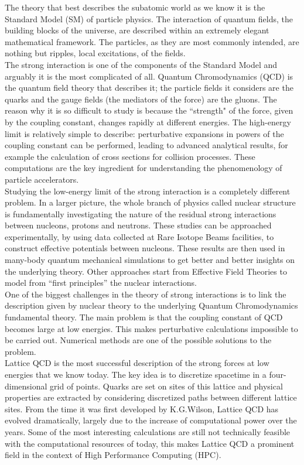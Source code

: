 The theory that best describes the subatomic world as we know it is the Standard Model (SM) of particle physics. The interaction of quantum fields, the building blocks of the universe, are described within an extremely elegant mathematical framework. The particles, as they are most commonly intended, are nothing but ripples, local excitations, of the fields.\\
The strong interaction is one of the components of the Standard Model and arguably it is the most complicated of all. Quantum Chromodynamics (QCD) is the quantum field theory that describes it; the particle fields it considers are the quarks and the gauge fields (the mediators of the force) are the gluons. The reason why it is so difficult to study is because the ``strength" of the force, given by the coupling constant, changes rapidly at different energies. The high-energy limit is relatively simple to describe: perturbative expansions in powers of the coupling constant can be performed, leading to advanced analytical results, for example the calculation of cross sections for collision processes. These computations are the key ingredient for understanding the phenomenology of particle accelerators.\\
Studying the low-energy limit of the strong interaction is a completely different problem. In a larger picture, the whole branch of physics called nuclear structure is fundamentally investigating the nature of the residual strong interactions between nucleons, protons and neutrons. These studies can be approached experimentally, by using data collected at Rare Isotope Beams facilities, to construct effective potentials between nucleons. These results are then used in many-body quantum mechanical simulations to get better and better insights on the underlying theory. Other approaches start from Effective Field Theories to model from ``first principles'' the nuclear interactions.\\
One of the biggest challenges in the theory of strong interactions is to link the description given by nuclear theory to the underlying Quantum Chromodynamics fundamental theory. The main problem is that the coupling constant of QCD becomes large at low energies. This makes perturbative calculations impossible to be carried out. Numerical methods are one of the possible solutions to the problem.\\

Lattice QCD is the most successful description of the strong forces at low energies that we know today. The key idea is to discretize spacetime in a four-dimensional grid of points. Quarks are set on sites of this lattice and physical properties are extracted by considering discretized paths between different lattice sites. From the time it was first developed by K.G.Wilson\cite{wilson_confinement_1974}, Lattice QCD has evolved dramatically, largely due to the increase of computational power over the years. Some of the most interesting calculations are still not technically feasible with the computational resources of today, this makes Lattice QCD a prominent field in the context of High Performance Computing (HPC). \\

